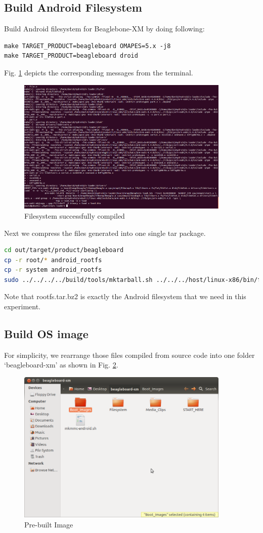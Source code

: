 \documentclass[10pt,journal,draftclsnofoot,onecolumn]{IEEEtran}
\begin{document}
\subsection{Build Android Filesystem}
Build Android filesystem for Beaglebone-XM by doing following:

 \begin{lstlisting}[language={make}]
make TARGET_PRODUCT=beagleboard OMAPES=5.x -j8
make TARGET_PRODUCT=beagleboard droid 
\end{lstlisting}
Fig. \ref{filesystem} depicts the corresponding messages from the terminal.
\begin{figure}[ht]
	\centering
	\includegraphics[width=4in]{./figs/x-loader.png}
	\caption{Filesystem successfully compiled}
	\label{filesystem}
\end{figure}

Next we compress the files generated into one single tar package. 
 \begin{lstlisting}[language={bash}]
cd out/target/product/beagleboard
cp -r root/* android_rootfs
cp -r system android_rootfs
sudo ../../../../build/tools/mktarball.sh ../../../host/linux-x86/bin/fs_get_stats android_rootfs . rootfs rootfs.tar.bz2
\end{lstlisting}
Note that rootfs.tar.bz2 is exactly the Android filesystem that we need in this experiment.

\subsection{Build OS image}
For simplicity, we rearrange those files compiled from source code into one folder `beagleboard-xm' as shown in Fig. \ref{bb-xm}.
\begin{figure}[ht]
	\centering
	\includegraphics[width=4in]{./figs/bb-xm.png}
	\caption{Pre-built Image}
	\label{bb-xm}
\end{figure}
\end{document}
